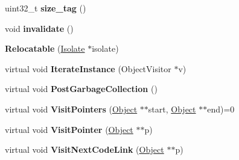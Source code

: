 \begin{DoxyCompactItemize}
\item 
\hypertarget{classv8_1_1internal_1_1_b_a_s_e___e_m_b_e_d_d_e_d_a808c81fe03691dfabc4f8539790e0923}{}uint32\+\_\+t {\bfseries size\+\_\+tag} ()\label{classv8_1_1internal_1_1_b_a_s_e___e_m_b_e_d_d_e_d_a808c81fe03691dfabc4f8539790e0923}

\item 
\hypertarget{classv8_1_1internal_1_1_b_a_s_e___e_m_b_e_d_d_e_d_accd99bb892ef538cac67bb49acc9ef9e}{}void {\bfseries invalidate} ()\label{classv8_1_1internal_1_1_b_a_s_e___e_m_b_e_d_d_e_d_accd99bb892ef538cac67bb49acc9ef9e}

\item 
\hypertarget{classv8_1_1internal_1_1_b_a_s_e___e_m_b_e_d_d_e_d_ad10a017d493f27f3d8d5b989bac324bb}{}{\bfseries Relocatable} (\hyperlink{classv8_1_1internal_1_1_isolate}{Isolate} $\ast$isolate)\label{classv8_1_1internal_1_1_b_a_s_e___e_m_b_e_d_d_e_d_ad10a017d493f27f3d8d5b989bac324bb}

\item 
\hypertarget{classv8_1_1internal_1_1_b_a_s_e___e_m_b_e_d_d_e_d_a01898b35021399be9a23489ea8d45cbb}{}virtual void {\bfseries Iterate\+Instance} (Object\+Visitor $\ast$v)\label{classv8_1_1internal_1_1_b_a_s_e___e_m_b_e_d_d_e_d_a01898b35021399be9a23489ea8d45cbb}

\item 
\hypertarget{classv8_1_1internal_1_1_b_a_s_e___e_m_b_e_d_d_e_d_a3423a94727f01cf7c4b232e5245081fe}{}virtual void {\bfseries Post\+Garbage\+Collection} ()\label{classv8_1_1internal_1_1_b_a_s_e___e_m_b_e_d_d_e_d_a3423a94727f01cf7c4b232e5245081fe}

\item 
\hypertarget{classv8_1_1internal_1_1_b_a_s_e___e_m_b_e_d_d_e_d_ab2b29c0023181994eb89c436d8ec3835}{}virtual void {\bfseries Visit\+Pointers} (\hyperlink{classv8_1_1internal_1_1_object}{Object} $\ast$$\ast$start, \hyperlink{classv8_1_1internal_1_1_object}{Object} $\ast$$\ast$end)=0\label{classv8_1_1internal_1_1_b_a_s_e___e_m_b_e_d_d_e_d_ab2b29c0023181994eb89c436d8ec3835}

\item 
\hypertarget{classv8_1_1internal_1_1_b_a_s_e___e_m_b_e_d_d_e_d_a6c79eb72fc76548cd257170c37d75a89}{}virtual void {\bfseries Visit\+Pointer} (\hyperlink{classv8_1_1internal_1_1_object}{Object} $\ast$$\ast$p)\label{classv8_1_1internal_1_1_b_a_s_e___e_m_b_e_d_d_e_d_a6c79eb72fc76548cd257170c37d75a89}

\item 
\hypertarget{classv8_1_1internal_1_1_b_a_s_e___e_m_b_e_d_d_e_d_a8594a25f995086eefb87905659b5da76}{}virtual void {\bfseries Visit\+Next\+Code\+Link} (\hyperlink{classv8_1_1internal_1_1_object}{Object} $\ast$$\ast$p)\label{classv8_1_1internal_1_1_b_a_s_e___e_m_b_e_d_d_e_d_a8594a25f995086eefb87905659b5da76}


\end{DoxyCompactItemize}
